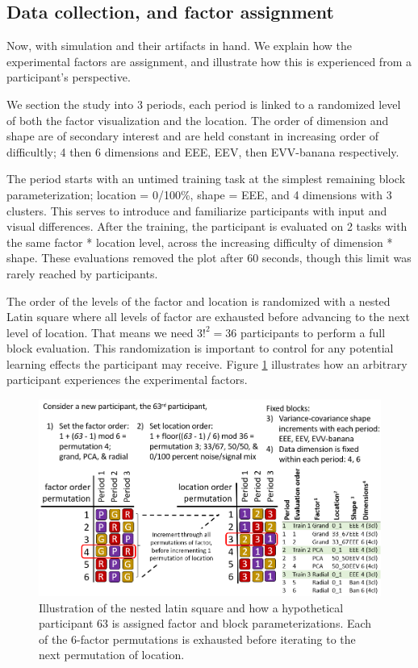 \documentclass{template/monashthesis}
\begin{document}
\hypertarget{data-collection-and-factor-assignment}{%
\subsection{Data collection, and factor assignment}\label{data-collection-and-factor-assignment}}

Now, with simulation and their artifacts in hand. We explain how the experimental factors are assignment, and illustrate how this is experienced from a participant's perspective.

We section the study into 3 periods, each period is linked to a randomized level of both the factor visualization and the location. The order of dimension and shape are of secondary interest and are held constant in increasing order of difficultly; 4 then 6 dimensions and EEE, EEV, then EVV-banana respectively.

The period starts with an untimed training task at the simplest remaining block parameterization; location = 0/100\%, shape = EEE, and 4 dimensions with 3 clusters. This serves to introduce and familiarize participants with input and visual differences. After the training, the participant is evaluated on 2 tasks with the same factor * location level, across the increasing difficulty of dimension * shape. These evaluations removed the plot after 60 seconds, though this limit was rarely reached by participants.

The order of the levels of the factor and location is randomized with a nested Latin square where all levels of factor are exhausted before advancing to the next level of location. That means we need \(3!^2 = 36\) participants to perform a full block evaluation. This randomization is important to control for any potential learning effects the participant may receive. Figure \ref{fig:ch4fig4} illustrates how an arbitrary participant experiences the experimental factors.

\begin{figure}

{\centering \includegraphics[width=1\linewidth,]{./figures_from_script/ch4_fig4_randomization_MANUAL} 

}

\caption{Illustration of the nested latin square and how a hypothetical participant 63 is assigned factor and block parameterizations. Each of the 6-factor permutations is exhausted before iterating to the next permutation of location.}\label{fig:ch4fig4}
\end{figure}
\end{document}
